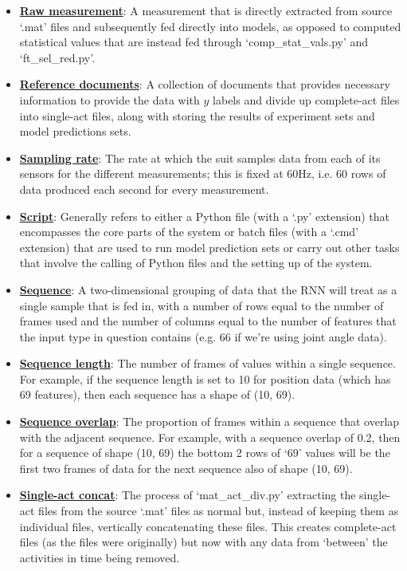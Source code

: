 \documentclass[12pt,twoside]{report}
\begin{document}
\begin{itemize}
	\item \underline{\textbf{Raw measurement}}: A measurement that is directly extracted from source ‘.mat’ files and subsequently fed directly into models, as opposed to computed statistical values that are instead fed through ‘comp\_stat\_vals.py’ and ‘ft\_sel\_red.py’.
	\item \underline{\textbf{Reference documents}}: A collection of documents that provides necessary information to provide the data with $y$ labels and divide up complete-act files into single-act files, along with storing the results of experiment sets and model predictions sets.
	\item \underline{\textbf{Sampling rate}}: The rate at which the suit samples data from each of its sensors for the different measurements; this is fixed at 60Hz, i.e. 60 rows of data produced each second for every measurement.
	\item \underline{\textbf{Script}}: Generally refers to either a Python file (with a ‘.py’ extension) that encompasses the core parts of the system or batch files (with a ‘.cmd’ extension) that are used to run model prediction sets or carry out other tasks that involve the calling of Python files and the setting up of the system.
	\item \underline{\textbf{Sequence}}: A two-dimensional grouping of data that the RNN will treat as a single sample that is fed in, with a number of rows equal to the number of frames used and the number of columns equal to the number of features that the input type in question contains (e.g. 66 if we’re using joint angle data).
	\item \underline{\textbf{Sequence length}}: The number of frames of values within a single sequence. For example, if the sequence length is set to 10 for position data (which has 69 features), then each sequence has a shape of (10, 69).
	\item \underline{\textbf{Sequence overlap}}: The proportion of frames within a sequence that overlap with the adjacent sequence. For example, with a sequence overlap of 0.2, then for a sequence of shape (10, 69) the bottom 2 rows of ‘69’ values will be the first two frames of data for the next sequence also of shape (10, 69).
	\item \underline{\textbf{Single-act concat}}: The process of ‘mat\_act\_div.py’ extracting the single-act files from the source ‘.mat’ files as normal but, instead of keeping them as individual files, vertically concatenating these files. This creates complete-act files (as the files were originally) but now with any data from ‘between’ the activities in time being removed.

\end{itemize}
\end{document}
